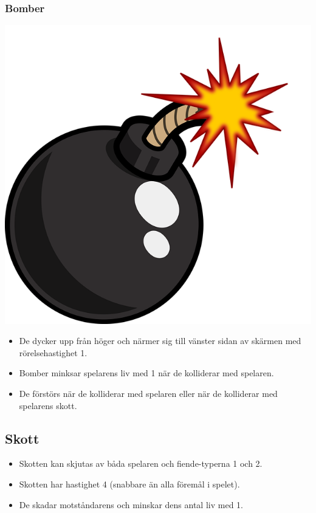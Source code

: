 \documentclass{TDP005mall}
\begin{document}
\subsubsection*{Bomber}
\includegraphics[scale=0.08]{Images/Bomb.png}\\
\begin{itemize}
\item De dycker upp från höger och närmer sig till vänster sidan av skärmen med rörelsehastighet 1.
\item Bomber minksar spelarens liv med 1 när de kolliderar med spelaren.
\item De förstörs när de kolliderar med spelaren eller när de kolliderar med spelarens skott.

\end{itemize}

\subsection{Skott}
\begin{itemize}
\item Skotten kan skjutas av båda spelaren och fiende-typerna 1 och 2.
\item Skotten har hastighet 4 (snabbare än alla föremål i spelet).
\item De skadar motståndarens och minskar dens antal liv med 1.
\end{itemize}
\end{document}

